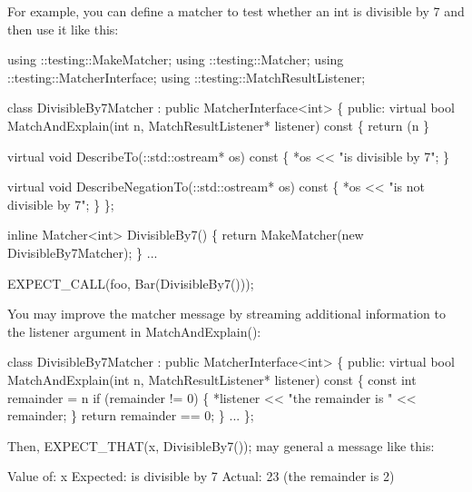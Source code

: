 For example, you can define a matcher to test whether an {\ttfamily int} is divisible by 7 and then use it like this\+: 
\begin{DoxyCode}
using ::testing::MakeMatcher;
using ::testing::Matcher;
using ::testing::MatcherInterface;
using ::testing::MatchResultListener;

\textcolor{keyword}{class }DivisibleBy7Matcher : \textcolor{keyword}{public} MatcherInterface<int> \{
 \textcolor{keyword}{public}:
  \textcolor{keyword}{virtual} \textcolor{keywordtype}{bool} MatchAndExplain(\textcolor{keywordtype}{int} n, MatchResultListener* listener)\textcolor{keyword}{ const }\{
    \textcolor{keywordflow}{return} (n %
  \}

  \textcolor{keyword}{virtual} \textcolor{keywordtype}{void} DescribeTo(::std::ostream* os)\textcolor{keyword}{ const }\{
    *os << \textcolor{stringliteral}{"is divisible by 7"};
  \}

  \textcolor{keyword}{virtual} \textcolor{keywordtype}{void} DescribeNegationTo(::std::ostream* os)\textcolor{keyword}{ const }\{
    *os << \textcolor{stringliteral}{"is not divisible by 7"};
  \}
\};

\textcolor{keyword}{inline} Matcher<int> DivisibleBy7() \{
  \textcolor{keywordflow}{return} MakeMatcher(\textcolor{keyword}{new} DivisibleBy7Matcher);
\}
...

  EXPECT\_CALL(foo, Bar(DivisibleBy7()));
\end{DoxyCode}


You may improve the matcher message by streaming additional information to the {\ttfamily listener} argument in {\ttfamily Match\+And\+Explain()}\+:


\begin{DoxyCode}
\textcolor{keyword}{class }DivisibleBy7Matcher : \textcolor{keyword}{public} MatcherInterface<int> \{
 \textcolor{keyword}{public}:
  \textcolor{keyword}{virtual} \textcolor{keywordtype}{bool} MatchAndExplain(\textcolor{keywordtype}{int} n,
                               MatchResultListener* listener)\textcolor{keyword}{ const }\{
    \textcolor{keyword}{const} \textcolor{keywordtype}{int} remainder = n %
    \textcolor{keywordflow}{if} (remainder != 0) \{
      *listener << \textcolor{stringliteral}{"the remainder is "} << remainder;
    \}
    \textcolor{keywordflow}{return} remainder == 0;
  \}
  ...
\};
\end{DoxyCode}


Then, {\ttfamily E\+X\+P\+E\+C\+T\+\_\+\+T\+H\+A\+T(x, Divisible\+By7());} may general a message like this\+: 
\begin{DoxyCode}
Value of: x
Expected: is divisible by 7
  Actual: 23 (the remainder is 2)
\end{DoxyCode}


